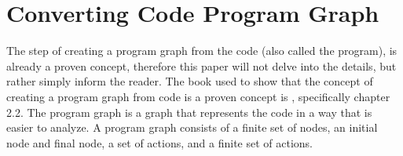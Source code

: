 \section{Converting Code Program Graph}
The step of creating a program graph from the code (also called the program), is already a proven concept, therefore this paper will not delve into the details, but rather simply inform the reader.
The book used to show that the concept of creating a program graph from code is a proven concept is \cite{nielson_formal_2019}, specifically chapter 2.2.
The program graph is a graph that represents the code in a way that is easier to analyze.
A program graph consists of a finite set of nodes, an initial node and final node, a set of actions, and a finite set of actions.
